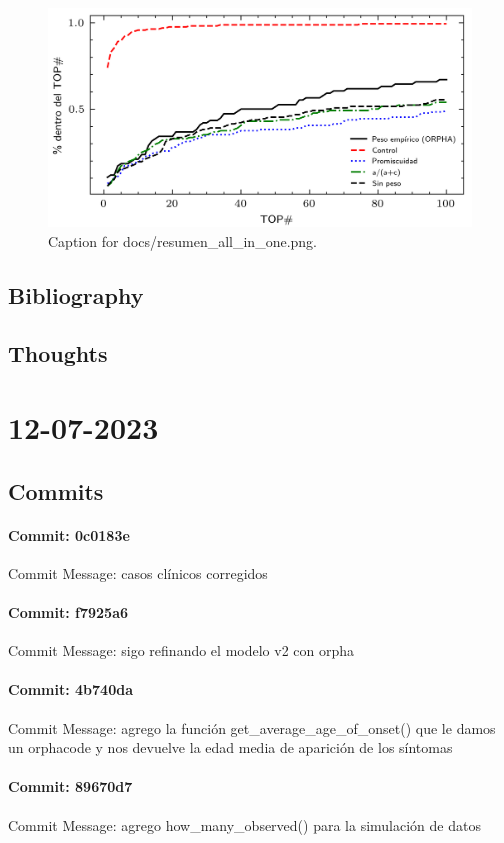 \documentclass{article}
\begin{document}
\begin{figure}[h] \centering \includegraphics{docs/resumen_all_in_one.png} \caption{Caption for docs/resumen_all_in_one.png.} \end{figure}
\subsection{Bibliography}
\subsection{Thoughts}

\section{12-07-2023}
\subsection{Commits}
\paragraph{Commit: 0c0183e}
Commit Message: casos clínicos corregidos

\paragraph{Commit: f7925a6}
Commit Message: sigo refinando el modelo v2 con orpha

\paragraph{Commit: 4b740da}
Commit Message: agrego la función get_average_age_of_onset() que le damos un orphacode y nos devuelve la edad media de aparición de los síntomas

\paragraph{Commit: 89670d7}
Commit Message: agrego how_many_observed() para la simulación de datos
\end{document}
